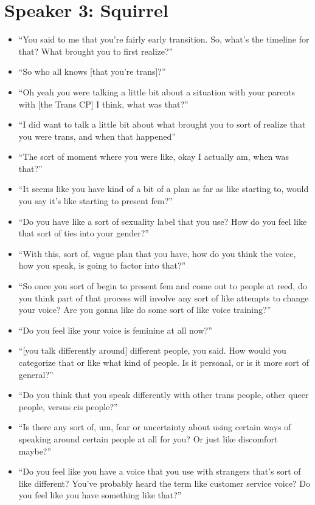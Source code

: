 \documentclass[12pt,twoside]{reedthesis}
\begin{document}
\section{Speaker 3: Squirrel}
\begin{itemize}
 \item ``You said to me that you're fairly early transition. So, what's the timeline for that? What brought you to first realize?''
 \item ``So who all knows [that you're trans]?''
 \item ``Oh yeah you were talking a little bit about a situation with your parents with [the Trans CP] I think, what was that?''
 \item ``I did want to talk a little bit about what brought you to sort of realize that you were trans, and when that happened''
 \item ``The sort of moment where you were like, okay I actually am, when was that?''
 \item ``It seems like you have kind of a bit of a plan as far as like starting to, would you say it's like starting to present fem?''
 \item ``Do you have like a sort of sexuality label that you use? How do you feel like that sort of ties into your gender?''
 \item ``With this, sort of, vague plan that you have, how do you think the voice, how you speak, is going to factor into that?''
 \item ``So once you sort of begin to present fem and come out to people at reed, do you think part of that process will involve any sort of like attempts to change your voice? Are you gonna like do some sort of like voice training?''
 \item ``Do you feel like your voice is feminine at all now?''
 \item ``[you talk differently around] different people, you said. How would you categorize that or like what kind of people. Is it personal, or is it more sort of general?''
 \item ``Do you think that you speak differently with other trans people, other queer people, versus cis people?''
 \item ``Is there any sort of, um, fear or uncertainty about using certain ways of speaking around certain people at all for you? Or just like discomfort maybe?''
 \item ``Do you feel like you have a voice that you use with strangers that's sort of like different? You've probably heard the term like customer service voice? Do you feel like you have something like that?''

\end{itemize}
\end{document}

